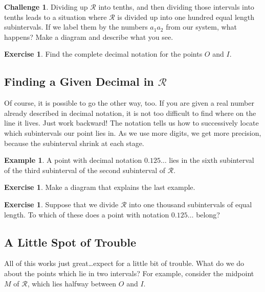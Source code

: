\documentclass[12pt,letterpaper]{article}
\theoremstyle{definition}
\newtheorem{example}{Example}
\newtheorem{exercise}[question]{Exercise}
\newtheorem*{challenge}{Challenge}
\begin{document}
\begin{challenge}
Dividing up $\mathcal{R}$ into tenths, and then dividing those intervals into tenths leads to a situation where $\mathcal{R}$ is divided up into one hundred equal length subintervals.
If we label them by the numbers $a_1a_2$ from our system, what happens?
Make a diagram and describe what you see.
\end{challenge}

\begin{exercise}
Find the complete decimal notation for the points $O$ and $I$.
\end{exercise}


\subsection*{Finding a Given Decimal in $\mathcal{R}$}

Of course, it is possible to go the other way, too.
If you are given a real number already described in decimal notation, it is not too difficult to find where on the line it lives.
Just work backward!
The notation tells us how to successively locate which subintervals our point lies in.
As we use more digits, we get more precision, because the subinterval shrink at each stage.

\begin{example}
A point with decimal notation $0.125\ldots$ lies in the sixth subinterval of the third subinterval of the second subinterval of $\mathcal{R}$.
\end{example}

\begin{exercise}
Make a diagram that explains the last example.
\end{exercise}

\begin{exercise}
Suppose that we divide $\mathcal{R}$ into one thousand subintervals of equal length.
To which of these does a point with notation $0.125\ldots$ belong?
\end{exercise}



\subsection*{A Little Spot of Trouble}

All of this works just great\dots expect for a little bit of trouble.
What do we do about the points which lie in two intervals?
For example, consider the midpoint $M$ of $\mathcal{R}$, which lies halfway between $O$ and $I$.
\end{document}
